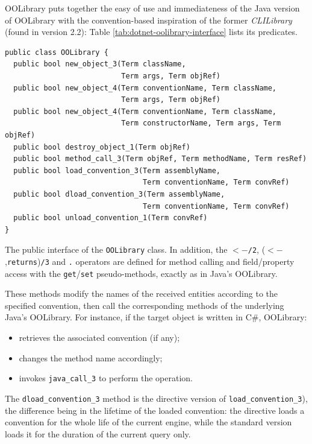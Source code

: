 OOLibrary puts together the easy of use and immediateness of the Java version of OOLibrary with the convention-based inspiration of the former \textit{CLILibrary} (found in version 2.2): Table \ref{tab:dotnet-oolibrary-interface} lists its predicates.
%
\begin{table}
{\small
\begin{verbatim}
public class OOLibrary {
  public bool new_object_3(Term className,
                           Term args, Term objRef)
  public bool new_object_4(Term conventionName, Term className,
                           Term args, Term objRef)
  public bool new_object_4(Term conventionName, Term className,
                           Term constructorName, Term args, Term objRef)
  public bool destroy_object_1(Term objRef)
  public bool method_call_3(Term objRef, Term methodName, Term resRef)
  public bool load_convention_3(Term assemblyName,
                                Term conventionName, Term convRef)
  public bool dload_convention_3(Term assemblyName,
                                Term conventionName, Term convRef)
  public bool unload_convention_1(Term convRef)
}
\end{verbatim}
}\caption{The public interface of the \texttt{OOLibrary} class. In addition, the \texttt{$<-$/2}, (\texttt{$<-$},\texttt{returns})\texttt{/3} and \texttt{.} operators are defined for method calling and field/property access with the \texttt{get}/\texttt{set} pseudo-methods, exactly as in Java's OOLibrary.}
\label{tab:dotnet-oolibrary-interface}
\end{table}

\noindent These methods modify the names of the received entities according to the specified convention, then call the corresponding methods of the underlying Java's OOLibrary.
For instance, if the target object is written in C\#, OOLibrary:
\begin{itemize}
  \item retrieves the associated convention (if any);
  \item changes the method name accordingly;
  \item invokes \texttt{java\_call\_3} to perform the operation.
\end{itemize}

\noindent The \texttt{dload\_convention\_3} method is the directive version of \texttt{load\_convention\_3}), the difference being in the lifetime of the loaded convention: the directive loads a convention for the whole life of the current \tuprolog{} engine, while the standard version loads it for the duration of the current query only.

